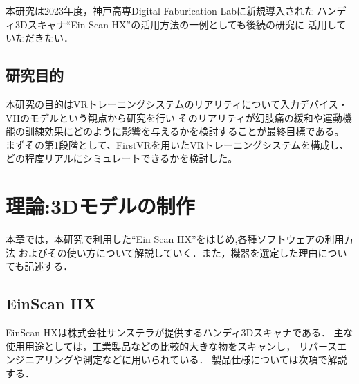 \documentclass{ltjsreport}
\begin{document}
	本研究は2023年度，神戸高専Digital Faburication Labに新規導入された
	ハンディ3Dスキャナ``Ein Scan HX''\cite{ref:5}の活用方法の一例としても後続の研究に
	活用していただきたい．

	\section{研究目的}
	本研究の目的はVRトレーニングシステムのリアリティについて入力デバイス・VHのモデルという観点から研究を行い
	そのリアリティが幻肢痛の緩和や運動機能の訓練効果にどのように影響を与えるかを検討することが最終目標である。
	まずその第1段階として、FirstVRを用いたVRトレーニングシステムを構成し、どの程度リアルにシミュレートできるかを検討した。

\chapter{理論:3Dモデルの制作}
	本章では，本研究で利用した``Ein Scan HX''をはじめ,各種ソフトウェアの利用方法
	およびその使い方について解説していく．また，機器を選定した理由についても記述する．

	\section{EinScan HX}
		EinScan HXは株式会社サンステラが提供するハンディ3Dスキャナである．
		主な使用用途としては，工業製品などの比較的大きな物をスキャンし，
		リバースエンジニアリングや測定などに用いられている．
		製品仕様については次項で解説する．
\end{document}
